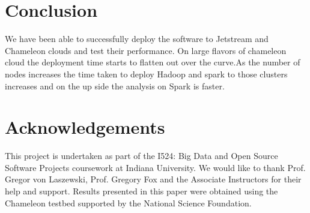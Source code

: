 \documentclass[9pt,twocolumn,twoside]{../../styles/osajnl}
\begin{document}
\section{Conclusion}

We have been able to successfully deploy the software to Jetstream and
Chameleon clouds and test their performance. On large flavors of
chameleon cloud the deployment time starts to flatten out over the
curve.As the number of nodes increases the time taken to deploy Hadoop
and spark to those clusters increases and on the up side the analysis
on Spark is faster.

\section*{Acknowledgements}
This project is undertaken as part of the I524: Big Data and Open
Source Software Projects coursework at Indiana University. We would
like to thank Prof. Gregor von Laszewski, Prof. Gregory Fox and the
Associate Instructors for their help and support. Results presented in
this paper were obtained using the Chameleon testbed supported by the
National Science Foundation.


\end{document}
